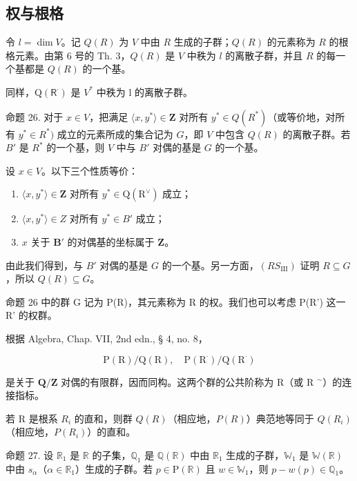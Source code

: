 \subsection{权与根格}

令 \(l = \dim V\)。记 \(Q(R)\) 为 \(V\) 中由 \(R\) 生成的子群；\(Q(R)\) 的元素称为 \(R\) 的根格元素。由第 6 号的 Th. 3，\(Q(R)\) 是 \(V\) 中秩为 \(l\) 的离散子群，并且 \(R\) 的每一个基都是 \(Q(R)\) 的一个基。

同样，\(\mathrm{Q}(\mathsf{R}^{\cdot})\) 是 \(V^{*}\) 中秩为 l 的离散子群。

 命题 26. 对于 \(x \in V\)，把满足 \(\langle x, y^* \rangle \in \mathbf{Z}\) 对所有 \(y^* \in Q(R^*)\)（或等价地，对所有 \(y^* \in R^*)\) 成立的元素所成的集合记为 \(G\)，即 \(V\) 中包含 \(Q(R)\) 的离散子群。若 \(B'\) 是 \(R^*\) 的一个基，则 \(V\) 中与 \(B'\) 对偶的基是 \(G\) 的一个基。

设 \(x \in V\)。以下三个性质等价：

\begin{enumerate}
\def\labelenumi{(\roman{enumi})}
\item
  \(\langle x, y^{*} \rangle \in \mathbf{Z}\) 对所有 \(y^{*} \in \mathrm{Q}(\mathrm{R}^{\vee})\) 成立；
\item
  \(\langle x, y^{*} \rangle \in Z\) 对所有 \(y^{*} \in B'\) 成立；
\item
  \(x\) 关于 \(\mathbf{B}'\) 的对偶基的坐标属于 \(\mathbf{Z}\)。
\end{enumerate}

由此我们得到，与 \(B'\) 对偶的基是 \(G\) 的一个基。另一方面，\((RS_{\mathrm{III}})\) 证明 \(R \subseteq G\)，所以 \(Q(R) \subseteq G\)。

命题 26 中的群 G 记为 P(R)，其元素称为 R 的权。我们也可以考虑 P(R') 这一 R' 的权群。

根据 Algebra, Chap. VII, 2nd edn., § 4, no. 8，

\[
\mathrm{P} (\mathrm{R}) / \mathrm{Q} (\mathrm{R}), \quad \mathrm{P} (\mathrm{R} ^ {\cdot}) / \mathrm{Q} (\mathrm{R} ^ {\cdot})
\]

是关于 \(\mathbf{Q} / \mathbf{Z}\) 对偶的有限群，因而同构。这两个群的公共阶称为 R（或 R \(^{\sim}\)）的连接指标。

若 R 是根系 \(R_{i}\) 的直和，则群 \(Q(R)\)（相应地，\(P(R)\)）典范地等同于 \(Q(R_{i})\)（相应地，\(P(R_{i})\)）的直和。

命题 27. 设 \(\mathbb{R}_1\) 是 \(\mathbb{R}\) 的子集，\(\mathbb{Q}_1\) 是 \(\mathbb{Q}(\mathbb{R})\) 中由 \(\mathbb{R}_1\) 生成的子群，\(\mathbb{W}_1\) 是 \(\mathbb{W}(\mathbb{R})\) 中由 \(s_\alpha\)（\(\alpha \in \mathbb{R}_1\)）生成的子群。若 \(p \in \mathrm{P}(\mathbb{R})\) 且 \(w \in \mathbb{W}_1\)，则 \(p - w(p) \in \mathbb{Q}_1\)。

